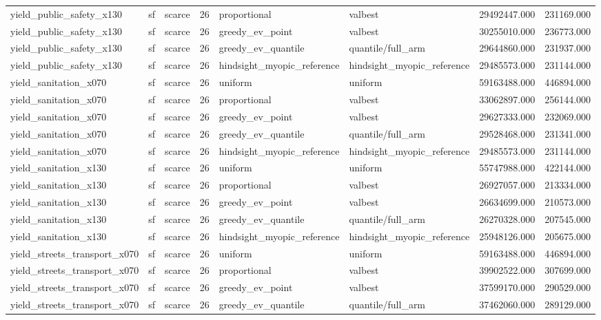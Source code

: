 \begin{tabular}{lllrllrr}
yield\_public\_safety\_x130 & sf & scarce & 26 & proportional & valbest & 29492447.000 & 231169.000 \\
yield\_public\_safety\_x130 & sf & scarce & 26 & greedy\_ev\_point & valbest & 30255010.000 & 236773.000 \\
yield\_public\_safety\_x130 & sf & scarce & 26 & greedy\_ev\_quantile & quantile/full\_arm & 29644860.000 & 231937.000 \\
yield\_public\_safety\_x130 & sf & scarce & 26 & hindsight\_myopic\_reference & hindsight\_myopic\_reference & 29485573.000 & 231144.000 \\
yield\_sanitation\_x070 & sf & scarce & 26 & uniform & uniform & 59163488.000 & 446894.000 \\
yield\_sanitation\_x070 & sf & scarce & 26 & proportional & valbest & 33062897.000 & 256144.000 \\
yield\_sanitation\_x070 & sf & scarce & 26 & greedy\_ev\_point & valbest & 29627333.000 & 232069.000 \\
yield\_sanitation\_x070 & sf & scarce & 26 & greedy\_ev\_quantile & quantile/full\_arm & 29528468.000 & 231341.000 \\
yield\_sanitation\_x070 & sf & scarce & 26 & hindsight\_myopic\_reference & hindsight\_myopic\_reference & 29485573.000 & 231144.000 \\
yield\_sanitation\_x130 & sf & scarce & 26 & uniform & uniform & 55747988.000 & 422144.000 \\
yield\_sanitation\_x130 & sf & scarce & 26 & proportional & valbest & 26927057.000 & 213334.000 \\
yield\_sanitation\_x130 & sf & scarce & 26 & greedy\_ev\_point & valbest & 26634699.000 & 210573.000 \\
yield\_sanitation\_x130 & sf & scarce & 26 & greedy\_ev\_quantile & quantile/full\_arm & 26270328.000 & 207545.000 \\
yield\_sanitation\_x130 & sf & scarce & 26 & hindsight\_myopic\_reference & hindsight\_myopic\_reference & 25948126.000 & 205675.000 \\
yield\_streets\_transport\_x070 & sf & scarce & 26 & uniform & uniform & 59163488.000 & 446894.000 \\
yield\_streets\_transport\_x070 & sf & scarce & 26 & proportional & valbest & 39902522.000 & 307699.000 \\
yield\_streets\_transport\_x070 & sf & scarce & 26 & greedy\_ev\_point & valbest & 37599170.000 & 290529.000 \\
yield\_streets\_transport\_x070 & sf & scarce & 26 & greedy\_ev\_quantile & quantile/full\_arm & 37462060.000 & 289129.000 \\

\end{tabular}
